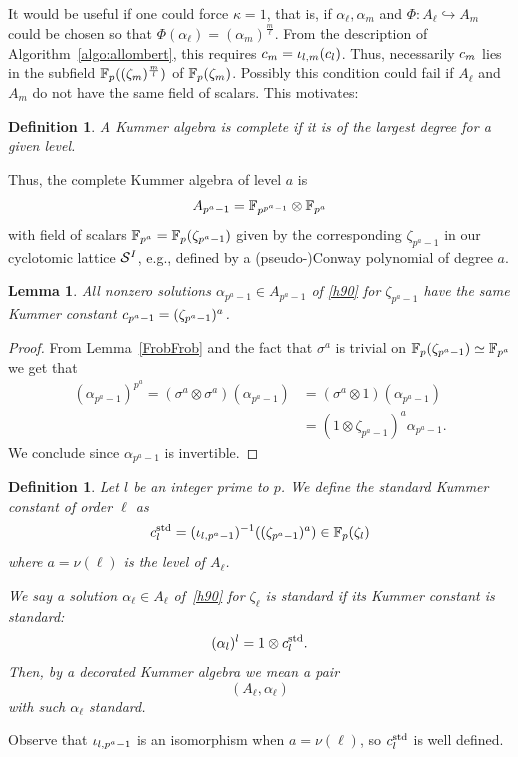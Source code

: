 \documentclass{sig-alternate}
\newtheorem{lemma}[theorem]{Lemma}
\newtheorem{definition}[theorem]{Definition}
\begin{document}
It would be useful if one could force $\kappa=1$, that is, if $\alpha_\ell,\alpha_m$
and $\Phi:A_\ell\hookrightarrow A_m$
could be chosen so that $\Phi(\alpha_\ell)=(\alpha_m)^{\frac{m}{\ell}}$.
From the description of Algorithm~\ref{algo:allombert},
this requires $c_m={\iota_{{l},{m}}}(c_l)$.
Thus,
necessarily $c_m$ lies in the subfield $\mathbb{F}_{p}((\zeta_m)^{\frac{m}{l}})$ of $\mathbb{F}_{p}(\zeta_m)$.
Possibly this condition could fail if $A_\ell$ and $A_m$ do not have the same field of scalars.
This motivates:
\begin{definition}
\label{complete}
A Kummer algebra is \emph{complete} if it is of the largest degree for a given level.
\end{definition}
Thus, the complete Kummer algebra of level $a$ is
\[ A_{p^a-1}=\mathbb{F}_{p^{p^a-1}}\otimes\mathbb{F}_{p^a} \]
with field of scalars $\mathbb{F}_{p^a}=\mathbb{F}_{p}(\zeta_{p^a-1})$ given by the corresponding $\zeta_{p^a-1}$ in our cyclotomic lattice $\mathcal{S}^{I}$,
e.g., defined by a (pseudo-)Conway polynomial of degree $a$.
\begin{lemma}
\label{Kummer_bizarre}
All nonzero solutions $\alpha_{p^a-1}\in A_{p^a-1}$ of \eqref{h90} for $\zeta_{p^a-1}$
have the same Kummer constant $c_{p^a-1}=(\zeta_{p^a-1})^a$.
\end{lemma}
\begin{proof}
From Lemma~\ref{FrobFrob} and the fact that $\sigma^a$ is trivial on $\mathbb{F}_{p}(\zeta_{p^a-1})\simeq\mathbb{F}_{p^a}$ we get that
\begin{equation*}
\begin{split}
(\alpha_{p^a-1})^{p^a}=(\sigma^a\otimes\sigma^a)(\alpha_{p^a-1})&=(\sigma^a\otimes1)(\alpha_{p^a-1})\\
&=(1\otimes\zeta_{p^a-1})^a\alpha_{p^a-1}.
\end{split}
\end{equation*}
We conclude since $\alpha_{p^a-1}$ is invertible.
\end{proof}
\begin{definition}
\label{alphastandard}
Let $l$ be an integer prime to $p$.
We define the \emph{standard} Kummer constant of order $\ell$ as
\[ c^{\mathrm{std}}_{l}=({\iota_{{l},{p^a-1}}})^{-1}((\zeta_{p^a-1})^a)\in\mathbb{F}_p(\zeta_l) \]
where $a=\nu(\ell)$ is the level of $A_\ell$.

We say a solution $\alpha_\ell\in A_\ell$ of~\eqref{h90} for $\zeta_\ell$ is
\emph{standard} if its Kummer constant is standard:
\[ (\alpha_l)^l=1\otimes c^{\mathrm{std}}_{l}. \]
Then, by a \emph{decorated} Kummer algebra we mean a pair
\[ (A_\ell,\alpha_{\ell}) \]
with such $\alpha_\ell$ standard.
\end{definition}
Observe that ${\iota_{{l},{p^a-1}}}$ is an isomorphism when $a=\nu(\ell)$,
so $c^{\mathrm{std}}_l$ is well defined.
\end{document}
